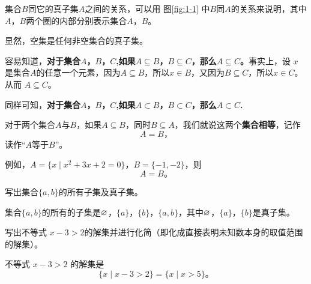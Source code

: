 集合$B$同它的真子集$A$之间的关系，可以用 图\ref{fig:1-1} 中$B$同$A$的关系来说明，其中$A$，$B$两个圈的内部分别表示集合$A$，$B$。

显然，空集是任何非空集合的真子集。

容易知道，\textbf{对于集合$A$，$B$，$C$,如果$A \subseteq B$，$B \subseteq C$，那么$A \subseteq C$。}事实上，设 $x$ 是集合$A$的任意一个元素，因为$A \subseteq B$，所以$x \in B$，又因为$B \subseteq C$，所以$x \in C$。从而 $A \subseteq C$。

同样可知，\textbf{对于集合$A$，$B$，$C$,如果$A \subset B$，$B \subset C$，那么$A \subset C$.}

对于两个集合$A$与$B$，如果$A \subseteq B$，同时$B \subseteq A$，我们就说这两个\textbf{集合相等}，记作
$$A = B \text{，}$$
读作“$A$等于$B$”。

例如，$A = \{x \mid x^2+3x+2=0\}$，$B = \{-1, -2\}$，则 $$A = B \text{。}$$

\liti 写出集合$\{a, b\}$的所有子集及真子集。

\jie 集合$\{a, b\}$的所有的子集是$\varnothing$，$\{a\}$，$\{b\}$，$\{a,b\}$，其中$\varnothing$，$\{a\}$，$\{b\}$是真子集。

\liti 写出不等式 $x-3>2$的解集并进行化简（即化成直接表明未知数本身的取值范围的解集）。

\jie 不等式 $x-3>2$ 的解集是 $$\{x \mid x-3>2\} = \{x \mid x>5\} \text{。}$$

